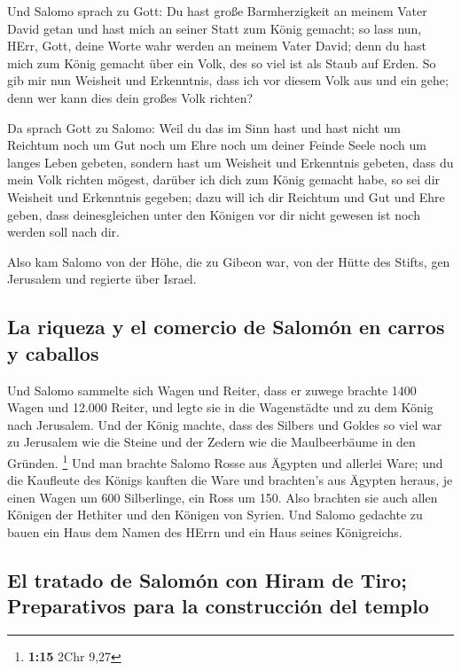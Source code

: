  Und Salomo sprach zu Gott: Du hast große Barmherzigkeit
an meinem Vater David getan und hast mich an seiner Statt zum König
gemacht;  so lass nun, HErr, Gott, deine Worte wahr werden
an meinem Vater David; denn du hast mich zum König gemacht über ein
Volk, des so viel ist als Staub auf Erden.  So gib mir
nun Weisheit und Erkenntnis, dass ich vor diesem Volk aus und ein gehe;
denn wer kann dies dein großes Volk richten?

 Da sprach Gott zu Salomo: Weil du das im Sinn hast und
hast nicht um Reichtum noch um Gut noch um Ehre noch um deiner Feinde
Seele noch um langes Leben gebeten, sondern hast um Weisheit und
Erkenntnis gebeten, dass du mein Volk richten mögest, darüber ich dich
zum König gemacht habe,  so sei dir Weisheit und
Erkenntnis gegeben; dazu will ich dir Reichtum und Gut und Ehre geben,
dass deinesgleichen unter den Königen vor dir nicht gewesen ist noch
werden soll nach dir.

 Also kam Salomo von der Höhe, die zu Gibeon war, von der
Hütte des Stifts, gen Jerusalem und regierte über Israel.

\hypertarget{la-riqueza-y-el-comercio-de-salomuxf3n-en-carros-y-caballos}{%
\subsection{La riqueza y el comercio de Salomón en carros y
caballos}\label{la-riqueza-y-el-comercio-de-salomuxf3n-en-carros-y-caballos}}

 Und Salomo sammelte sich Wagen und Reiter, dass er
zuwege brachte 1400 Wagen und 12.000 Reiter, und legte sie in die
Wagenstädte und zu dem König nach Jerusalem.  Und der
König machte, dass des Silbers und Goldes so viel war zu Jerusalem wie
die Steine und der Zedern wie die Maulbeerbäume in den Gründen.
\footnote{\textbf{1:15} 2Chr 9,27}  Und man brachte
Salomo Rosse aus Ägypten und allerlei Ware; und die Kaufleute des Königs
kauften die Ware  und brachten's aus Ägypten heraus, je
einen Wagen um 600 Silberlinge, ein Ross um 150. Also brachten sie auch
allen Königen der Hethiter und den Königen von Syrien. 
Und Salomo gedachte zu bauen ein Haus dem Namen des HErrn und ein Haus
seines Königreichs.

\hypertarget{el-tratado-de-salomuxf3n-con-hiram-de-tiro-preparativos-para-la-construcciuxf3n-del-templo}{%
\subsection{El tratado de Salomón con Hiram de Tiro; Preparativos para
la construcción del
templo}\label{el-tratado-de-salomuxf3n-con-hiram-de-tiro-preparativos-para-la-construcciuxf3n-del-templo}}

